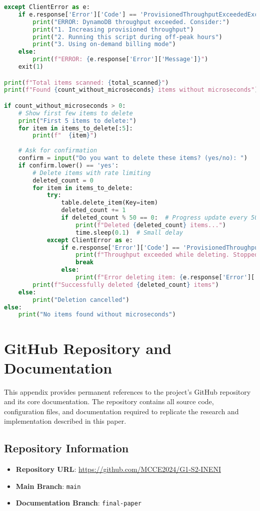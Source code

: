 \begin{lstlisting}[language=Python]
except ClientError as e:
    if e.response['Error']['Code'] == 'ProvisionedThroughputExceededException':
        print("ERROR: DynamoDB throughput exceeded. Consider:")
        print("1. Increasing provisioned throughput")
        print("2. Running this script during off-peak hours")
        print("3. Using on-demand billing mode")
    else:
        print(f"ERROR: {e.response['Error']['Message']}")
    exit(1)

print(f"Total items scanned: {total_scanned}")
print(f"Found {count_without_microseconds} items without microseconds")

if count_without_microseconds > 0:
    # Show first few items to delete
    print("First 5 items to delete:")
    for item in items_to_delete[:5]:
        print(f"  {item}")
    
    # Ask for confirmation
    confirm = input("Do you want to delete these items? (yes/no): ")
    if confirm.lower() == 'yes':
        # Delete items with rate limiting
        deleted_count = 0
        for item in items_to_delete:
            try:
                table.delete_item(Key=item)
                deleted_count += 1
                if deleted_count % 50 == 0:  # Progress update every 50 items
                    print(f"Deleted {deleted_count} items...")
                    time.sleep(0.1)  # Small delay
            except ClientError as e:
                if e.response['Error']['Code'] == 'ProvisionedThroughputExceededException':
                    print(f"Throughput exceeded while deleting. Stopped at {deleted_count} items.")
                    break
                else:
                    print(f"Error deleting item: {e.response['Error']['Message']}")
        print(f"Successfully deleted {deleted_count} items")
    else:
        print("Deletion cancelled")
else:
    print("No items found without microseconds")
\end{lstlisting}

\newpage
\section{GitHub Repository and Documentation}
\label{appendix:github-docs}

This appendix provides permanent references to the project's GitHub repository and its core documentation. The repository contains all source code, configuration files, and documentation required to replicate the research and implementation described in this paper.

\subsection{Repository Information}
\begin{itemize}
    \item \textbf{Repository URL}: \url{https://github.com/MCCE2024/G1-S2-INENI}
    \item \textbf{Main Branch}: \texttt{main}
    \item \textbf{Documentation Branch}: \texttt{final-paper}
\end{itemize}

